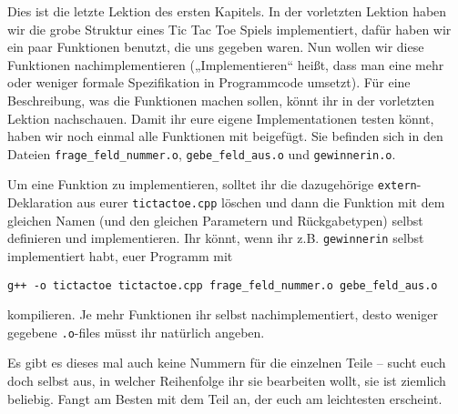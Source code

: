 
Dies ist die letzte Lektion des ersten Kapitels. In der vorletzten Lektion
haben wir die grobe Struktur eines Tic Tac Toe Spiels implementiert, dafür
haben wir ein paar Funktionen benutzt, die uns gegeben waren. Nun wollen wir
diese Funktionen nachimplementieren („Implementieren“ heißt, dass man eine mehr
oder weniger formale Spezifikation in Programmcode umsetzt). Für eine
Beschreibung, was die Funktionen machen sollen, könnt ihr in der vorletzten
Lektion nachschauen. Damit ihr eure eigene Implementationen testen könnt, haben
wir noch einmal alle Funktionen mit beigefügt. Sie befinden sich in den Dateien
\texttt{frage\_feld\_nummer.o}, \texttt{gebe\_feld\_aus.o} und
\texttt{gewinnerin.o}.

Um eine Funktion zu implementieren, solltet ihr die dazugehörige
\texttt{extern}-Deklaration aus eurer \texttt{tictactoe.cpp} löschen und dann
die Funktion mit dem gleichen Namen (und den gleichen Parametern und
Rückgabetypen) selbst definieren und implementieren. Ihr könnt, wenn ihr z.B.
\texttt{gewinnerin} selbst implementiert habt, euer Programm mit

\texttt{g++ -o tictactoe tictactoe.cpp frage\_feld\_nummer.o gebe\_feld\_aus.o}

kompilieren. Je mehr Funktionen ihr selbst nachimplementiert, desto weniger
gegebene \texttt{.o}-files müsst ihr natürlich angeben.

Es gibt es dieses mal auch keine Nummern für die einzelnen Teile -- sucht euch
doch selbst aus, in welcher Reihenfolge ihr sie bearbeiten wollt, sie ist
ziemlich beliebig. Fangt am Besten mit dem Teil an, der euch am leichtesten
erscheint.

